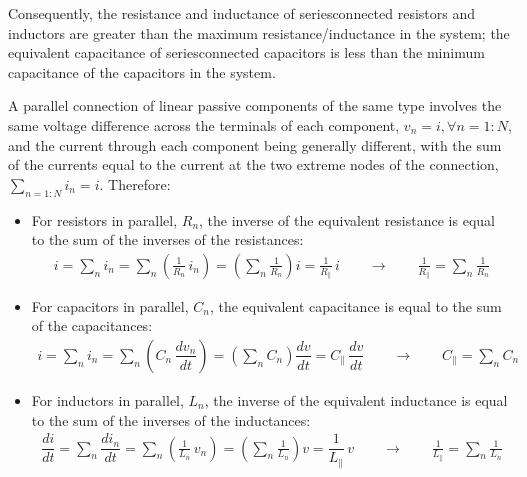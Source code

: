 \documentclass[letterpaper,10pt,english]{jupyterBook}
\begin{document}
\sphinxAtStartPar
Consequently, the resistance and inductance of series\sphinxhyphen{}connected resistors and inductors are greater than the maximum resistance/inductance in the system; the equivalent capacitance of series\sphinxhyphen{}connected capacitors is less than the minimum capacitance of the capacitors in the system.

\sphinxAtStartPar
{} A parallel connection of linear passive components of the same type involves the same voltage difference across the terminals of each component, \(v_n = i, \forall n=1:N\), and the current through each component being generally different, with the sum of the currents equal to the current at the two extreme nodes of the connection, \(\sum_{n=1:N} i_n = i\). Therefore:
\begin{itemize}
\item {} 
\sphinxAtStartPar
For resistors in parallel, \(R_n\), the inverse of the equivalent resistance is equal to the sum of the inverses of the resistances:
\begin{equation*}
\begin{split}i = \sum_n i_n = \sum_n \left( \frac{1}{R_n} \, i_n \right) = \left( \sum_n \frac{1}{R_n} \right) i = \frac{1}{R_{\parallel}} \, i \qquad \rightarrow \qquad \frac{1}{R_{\parallel}} = \sum_n \frac{1}{R_n}\end{split}
\end{equation*}
\item {} 
\sphinxAtStartPar
For capacitors in parallel, \(C_n\), the equivalent capacitance is equal to the sum of the capacitances:
\begin{equation*}
\begin{split}i = \sum_n i_n = \sum_n \left( C_n \, \dfrac{d v_n}{d t} \right) = \left( \sum_n C_n \right) \dfrac{d v}{dt} = C_{\parallel} \, \dfrac{d v}{dt} \qquad \rightarrow \qquad C_{\parallel} = \sum_n C_n\end{split}
\end{equation*}
\item {} 
\sphinxAtStartPar
For inductors in parallel, \(L_n\), the inverse of the equivalent inductance is equal to the sum of the inverses of the inductances:
\begin{equation*}
\begin{split}\dfrac{d i}{dt} = \sum_n \dfrac{d i_n}{dt} = \sum_n \left( \frac{1}{L_n} \, v_n \right) = \left( \sum_n \frac{1}{L_n} \right) v = \dfrac{1}{L_{\parallel}} \, v \qquad \rightarrow \qquad \frac{1}{L_{\parallel}} = \sum_n \frac{1}{L_n}\end{split}
\end{equation*}
\end{itemize}
\end{document}
